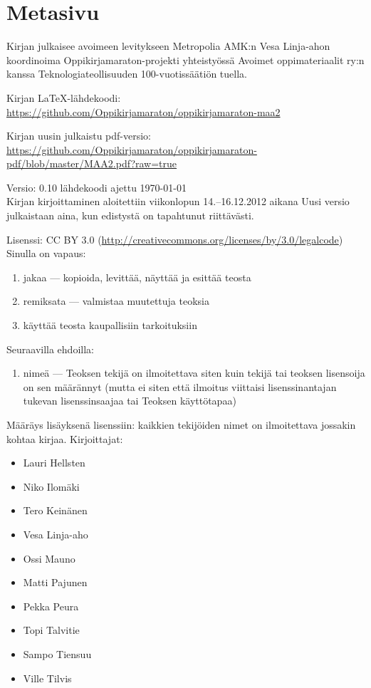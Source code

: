 \newpage
\section*{Metasivu}

Kirjan julkaisee avoimeen levitykseen Metropolia AMK:n Vesa Linja-ahon koordinoima Oppikirjamaraton-projekti yhteistyössä Avoimet oppimateriaalit ry:n kanssa Teknologiateollisuuden 100-vuotissäätiön tuella.

Kirjan LaTeX-lähdekoodi: \\
\url{https://github.com/Oppikirjamaraton/oppikirjamaraton-maa2}

Kirjan uusin julkaistu pdf-versio: \\
\url{https://github.com/Oppikirjamaraton/oppikirjamaraton-pdf/blob/master/MAA2.pdf?raw=true}

Versio: 0.10 \qquad lähdekoodi ajettu \today \\
Kirjan kirjoittaminen aloitettiin viikonlopun 14.--16.12.2012 aikana
Uusi versio julkaistaan aina, kun edistystä on tapahtunut riittävästi.

Lisenssi: CC BY 3.0 (\url{http://creativecommons.org/licenses/by/3.0/legalcode})\\
Sinulla on vapaus:
\begin{enumerate}
\item jakaa — kopioida, levittää, näyttää ja esittää teosta
\item remiksata — valmistaa muutettuja teoksia
\item käyttää teosta kaupallisiin tarkoituksiin
\end{enumerate}
Seuraavilla ehdoilla:
\begin{enumerate}
\item nimeä — Teoksen tekijä on ilmoitettava siten kuin tekijä tai teoksen lisensoija on sen määrännyt (mutta ei siten että ilmoitus viittaisi lisenssinantajan tukevan lisenssinsaajaa tai Teoksen käyttötapaa)
\end{enumerate}

Määräys lisäyksenä lisenssiin: kaikkien tekijöiden nimet on ilmoitettava jossakin kohtaa kirjaa.
Kirjoittajat:
\begin{itemize}
\item Lauri Hellsten
\item Niko Ilomäki
\item Tero Keinänen
\item Vesa Linja-aho
\item Ossi Mauno
\item Matti Pajunen
\item Pekka Peura
\item Topi Talvitie
\item Sampo Tiensuu
\item Ville Tilvis
\end{itemize}

